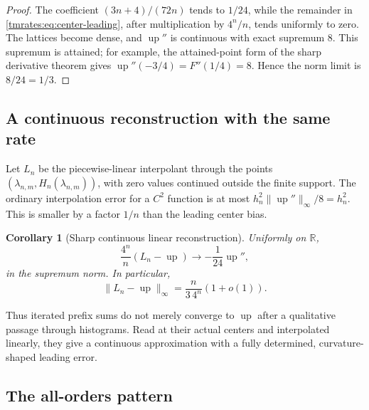 \documentclass[11pt,oneside]{article}
\newtheorem{corollary}[theorem]{Corollary}
\theoremstyle{definition}
\theoremstyle{remark}
\newcommand{\R}{\mathbb R}
\newcommand{\Up}{\operatorname{up}}
\begin{document}
\begin{proof}
The coefficient $(3n+4)/(72n)$ tends to $1/24$, while the remainder in
\eqref{tmrates:eq:center-leading}, after multiplication by $4^n/n$, tends uniformly to zero.  The
lattices become dense, and $\Up''$ is continuous with exact supremum $8$.  This supremum
is attained; for example, the attained-point form of the sharp derivative theorem gives
$\Up''(-3/4)=F''(1/4)=8$.  Hence the norm limit is $8/24=1/3$.
\end{proof}

\subsection{A continuous reconstruction with the same rate}

Let $L_n$ be the piecewise-linear interpolant through the points
$(\lambda_{n,m},H_n(\lambda_{n,m}))$, with zero values continued outside the finite support.
The ordinary interpolation error for a $C^2$ function is at most
$h_n^2\|\Up''\|_\infty/8=h_n^2$.  This is smaller by a factor $1/n$ than the leading
center bias.

\begin{corollary}[Sharp continuous linear reconstruction]
\label{tmrates:cor:linear-rate}
Uniformly on $\R$,
\begin{equation}
 \frac{4^n}{n}(L_n-\Up)\longrightarrow-\frac1{24}\Up'',   \label{tmrates:eq:linear-profile}
\end{equation}
in the supremum norm.  In particular,
\begin{equation}
 \|L_n-\Up\|_\infty=\frac n{3\,4^n}(1+o(1)).              \label{tmrates:eq:linear-sharp}
\end{equation}
\end{corollary}

Thus iterated prefix sums do not merely converge to $\Up$ after a qualitative passage through
histograms.  Read at their actual centers and interpolated linearly, they give a continuous
approximation with a fully determined, curvature-shaped leading error.

\subsection{The all-orders pattern}
\end{document}
